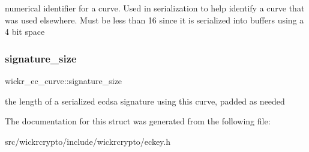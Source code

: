 numerical identifier for a curve. Used in serialization to help identify a curve that was used elsewhere. Must be less than 16 since it is serialized into buffers using a 4 bit space \mbox{\label{structwickr__ec__curve_ab77300e816beace29e40cf8e643a5070}} 
\subsubsection{\texorpdfstring{signature\_size}{signature\_size}}
{\footnotesize\ttfamily wickr\+\_\+ec\+\_\+curve\+::signature\+\_\+size}

the length of a serialized ecdsa signature using this curve, padded as needed 

The documentation for this struct was generated from the following file\+:\begin{DoxyCompactItemize}
\item 
src/wickrcrypto/include/wickrcrypto/eckey.\+h\end{DoxyCompactItemize}
